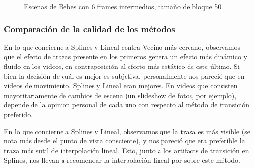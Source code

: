 \begin{figure}
\hfill
{}
\hfill
{}
\hfill
\caption{Escenas de Bebes con 6 frames intermedios, tama\~no de bloque 50}
\end{figure}
\FloatBarrier

\subsubsection{Comparaci\'on de la calidad de los m\'etodos}
\par En lo que concierne a Splines y Lineal contra Vecino m\'as cercano, observamos que el efecto de trazas presente en los primeros genera un efecto m\'as din\'amico y fluido en los videos, en contraposici\'on al efecto m\'as est\'atico de este \'ultimo.
Si bien la decisi\'on de cu\'al es mejor es subjetiva, personalmente nos pareci\'o que en videos de movimiento, Splines y Lineal eran mejores.
En videos que consisten mayoritariamente de cambios de escena (un slideshow de fotos, por ejemplo), depende de la opinion personal de cada uno con respecto al m\'etodo de transici\'on preferido.
\par En lo que concierne a Splines y Lineal, observamos que la traza es m\'as visible (se nota m\'as desde el punto de vista consciente), y nos pareci\'o que era preferible la traza m\'as sutil de interpolaci\'on lineal.
Esto, junto a los artifacts de transici\'on en Splines, nos llevan a recomendar la interpolaci\'on lineal por sobre este m\'etodo.
